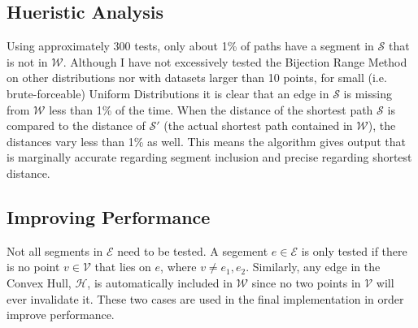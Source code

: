 \documentclass[12pt]{article}
\begin{document}
\subsection{Hueristic Analysis}\label{subsec:hueristic}
Using approximately 300 tests, only about 1\% of paths have a segment in
$\mathcal{S}$ that is not in $\mathcal{W}$.
Although I have not excessively tested the Bijection Range Method on other
distributions nor with datasets larger than 10 points, for small (i.e. brute-forceable)
Uniform Distributions it is clear that an edge in $\mathcal{S}$
is missing from $\mathcal{W}$ less than 1\% of the time. 
When the distance of the shortest path $\mathcal{S}$ is compared to the distance
of $\mathcal{S}'$ (the actual shortest path contained in $\mathcal{W}$), the distances
vary less than 1\% as well. This means the algorithm gives output that is marginally
accurate regarding segment inclusion and precise regarding shortest distance.

\subsection{Improving Performance}\label{subsec:performance}
Not all segments in $\mathcal{E}$ need to be tested.
A segement $e \in \mathcal{E}$ is only tested if there is no point
$v \in \mathcal{V}$ that lies on $e$, where $v \neq e_1,e_2$.
Similarly, any edge in the Convex Hull, $\mathcal{H}$, is
automatically included in $\mathcal{W}$ since no two points in $\mathcal{V}$
will ever invalidate it. These two cases are used in the final implementation
in order improve performance.
\end{document}
